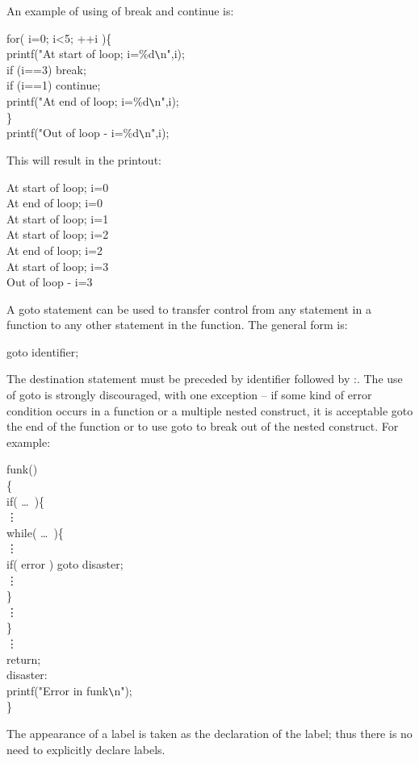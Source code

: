      An example of using of {\cd break} and {\cd continue} is:
\begin{code}
 for( i=0; i<5; ++i )\{ \+\\
      printf("At start of loop; i=\%d\verb+\+n",i); \\
      if (i==3) break; \\
      if (i==1) continue; \\
      printf("At end of loop; i=\%d\verb+\+n",i); \-\\
 \} \\
 printf("Out of loop - i=\%d\verb+\+n",i); 
\end{code}
\noindent
     This will result in the printout:
\begin{code}
  At start of loop; i=0 \\
  At end of loop; i=0 \\
  At start of loop; i=1 \\
  At start of loop; i=2 \\
  At end of loop; i=2 \\
  At start of loop; i=3 \\
  Out of loop - i=3 
\end{code}
\noindent
     A {\cd goto}  statement can 
be used to transfer control from any
statement in a function to any other statement in the function. The
general form is:
\begin{code}
goto  {\ms identifier\/};
\end{code}
\noindent
     The destination  statement must  be preceded by  {\ms
identifier\/} followed by {\cd :}.  The use  of {\cd goto}  is
strongly discouraged, with one exception -- if some kind of error
condition occurs in a function or a multiple nested construct, 
it is acceptable {\cd goto} the
end of the function or to use {\cd goto} to break out of the nested
construct. For example:
\begin{code}
  funk()							\\
  \{ 								\+\\
     if( \ldots\ )\{			\+\\
       \vdots					\\
		 while( \ldots\ )\{	\+\\
		   \vdots				\\
         if( error ) goto disaster; \\
		   \vdots 				\-\\
       \} 						\\
		 \vdots 					\-\\
     \} 							\\
	  \vdots 					\\
	  return; 					\-\\
  disaster: 					\\
  \> printf("Error in funk\verb+\+n"); \\
  \} 
\end{code}
\noindent
     The appearance  of a label is taken as the declaration of the
label; thus there is no need to explicitly declare labels.

